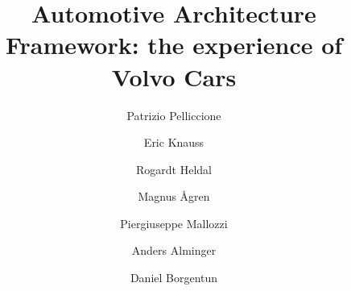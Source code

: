 \documentclass[preprint,12pt,3p]{elsarticle}
\begin{document}
\begin{frontmatter}

\title{Automotive Architecture Framework: the experience of Volvo Cars}




\author[label1]{Patrizio Pelliccione}
\author[label1]{Eric Knauss}
\author[label1]{Rogardt Heldal}
\author[label1]{Magnus \AA gren}
\author[label1]{Piergiuseppe Mallozzi}
\author[label2]{Anders Alminger}
\author[label2]{Daniel Borgentun}

\address[label1]{Chalmers University of Technology $|$ University of Gothenburg, Department of Computer Science and Engineering, Sweden}
\address[label2]{Volvo Cars, Sweden}





\end{frontmatter}
\end{document}
